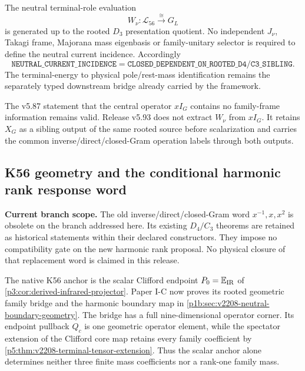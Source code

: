 \documentclass[12pt,a4paper]{article}
\begin{document}
\begin{corollary}
\label{p6:cor:v593-neutral-current-evaluation-closed}
The neutral terminal-role evaluation
\[
 \boxed{W_\nu:\mathscr L_{56}\xrightarrow{\cong}G_L}
\]
is generated up to the rooted $D_3$ presentation quotient.  No independent
$J_\nu$, Takagi frame, Majorana mass eigenbasis or family-unitary selector is
required to define the neutral current incidence.  Accordingly
\[
 \boxed{
 \texttt{NEUTRAL\_CURRENT\_INCIDENCE}
 =\texttt{CLOSED\_DEPENDENT\_ON\_ROOTED\_D4/C3\_SIBLING}.}
\]
The terminal-energy to physical pole/rest-mass identification remains the
separately typed downstream bridge already carried by the framework.
\end{corollary}

\begin{remark}
The v5.87 statement that the central operator $xI_G$ contains no family-frame
information remains valid.  Release v5.93 does not extract $W_\nu$ from
$xI_G$.  It retains $X_G$ as a sibling output of the same rooted source before
scalarization and carries the common inverse/direct/closed-Gram operation
labels through both outputs.
\end{remark}

\subsection{K56 geometry and the conditional harmonic rank response word}
\label{p6:sec:v2208-neutral-rank-word}
\noindent\textbf{Current branch scope.}
The old inverse/direct/closed-Gram word $x^{-1},x,x^2$ is obsolete on
the branch addressed here. Its existing $D_4/C_3$ theorems are retained
as historical statements within their declared constructors. They impose
no compatibility gate on the new harmonic rank proposal. No physical
closure of that replacement word is claimed in this release.

The native K56 anchor is the scalar Clifford endpoint
$P_0=\mathbb E_{\rm IR}$ of \ref{p3:cor:derived-infrared-projector}.
Paper I-C now proves its rooted geometric family bridge and the harmonic
boundary map in \ref{p1b:sec:v2208-neutral-boundary-geometry}.
The bridge has a full nine-dimensional operator corner. Its endpoint
pullback $Q_c$ is one geometric operator element, while the spectator
extension of the Clifford core map retains every family coefficient
by \ref{p5:thm:v2208-terminal-tensor-extension}.
Thus the scalar anchor alone determines neither three finite mass
coefficients nor a rank-one family mass.
\end{document}
